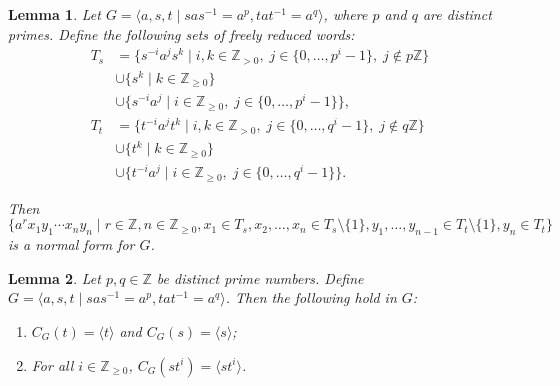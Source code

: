 \documentclass[10pt,a4paper]{amsart}
\newtheorem{lem}{Lemma}
\newcommand{\Z}{\mathbb{Z}}
\begin{document}
	\begin{lem}
		\label{GBS-norm-form}
		Let \(G = \langle a, s, t \mid sas^{-1} = a^p, tat^{-1} = a^q
		\rangle\), where \(p\) and \(q\) are distinct primes. 
Define
				the following sets of freely reduced words:
				\begin{align*} 
T_s & =    
\{ s^{-i} a^j s^k \mid i,k \in \Z_{> 0}, \; j \in \{0, \ldots, p^i - 1\}, \; j \not\in p\Z \}  \\
& \cup \{ s^k \mid k \in \Z_{\geq 0} \} \\ 
& \cup \{ s^{-i} a^j \mid i \in \Z_{\geq 0}, \; j \in \{0, \ldots, p^i - 1\} \}, \\ 
T_t & =    
\{ t^{-i} a^j t^k \mid i,k \in \Z_{> 0}, \; j \in \{0, \ldots, q^i - 1\}, \; j \not\in q\Z \}  \\
& \cup \{ t^k \mid k \in \Z_{\geq 0} \} \\ 
& \cup \{ t^{-i} a^j \mid i \in \Z_{\geq 0}, \; j \in \{0, \ldots, q^i - 1\} \}.   
\end{align*} 

		Then 
		\[
			\{a^r x_1 y_1 \cdots x_n y_n \mid r \in \Z, n \in \Z_{\geq 0},
					x_1 \in T_s, x_2, \ldots, x_n \in T_s \setminus \{1\}, 
			y_1, \ldots, y_{n - 1} \in T_t \setminus \{1\}, y_n \in T_t \}
		\]
		is a normal form for \(G\).
	\end{lem}

\begin{lem}
		\label{GBS-cents}
		Let \(p, q \in \mathbb{Z}\) be distinct prime numbers. Define 
		\(G = \langle a, s, t \mid sas^{-1} = a^p, tat^{-1} = a^q \rangle\).
		Then the following hold in \(G\):
		\begin{enumerate}
			\item \(C_G(t) = \langle t \rangle\) and \(C_G(s) = \langle s \rangle\);
					\label{GBS-cent-s-t}
			\item For all \(i \in \Z_{\geq 0}\), \(C_G(st^i) = \langle st^i \rangle\).
					\label{GBS-cent-sti}
		\end{enumerate}
	\end{lem}
\end{document}
